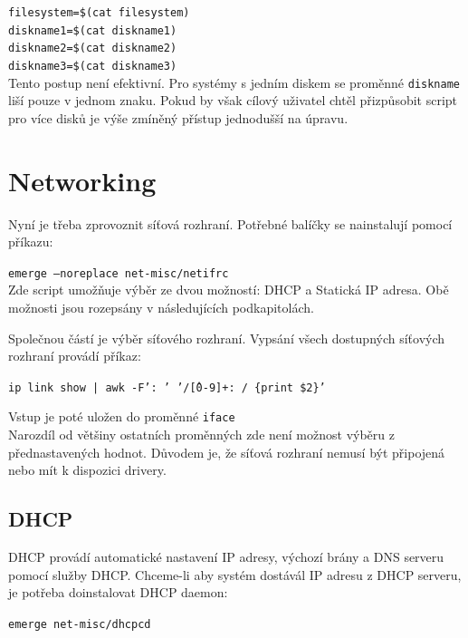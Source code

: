 \documentclass[12pt,a4paper,twoside,]{article}
\begin{document}
{{{{{{\texttt{filesystem=\$(cat filesystem)}\\
\hspace*{1.5em}\texttt{diskname1=\$(cat diskname1)}\\
\hspace*{1.5em}\texttt{diskname2=\$(cat diskname2)}\\
\hspace*{1.5em}\texttt{diskname3=\$(cat diskname3)}\\

\hspace*{-1.5em}Tento postup není efektivní. Pro systémy s jedním diskem se proměnné \texttt{diskname} liší pouze v jednom znaku. Pokud by však cílový uživatel chtěl přizpůsobit script pro více disků je výše zmíněný přístup jednodušší na úpravu.
\newpage

\section{\textsf{Networking}}
Nyní je třeba zprovoznit síťová rozhraní. Potřebné balíčky se nainstalují pomocí příkazu:

\texttt{emerge --noreplace net-misc/netifrc}\\


\hspace{-1.5em}Zde script umožňuje výběr ze dvou možností: DHCP a Statická IP adresa. Obě možnosti jsou rozepsány v následujících podkapitolách.

\hspace{-1.5em}Společnou částí je výběr síťového rozhraní. Vypsání všech dostupných síťových rozhraní provádí příkaz:

\texttt{ip link show | awk -F': ' '/\^[0-9]+: / \{print \$2\}'}

\hspace{-1.5em}Vstup je poté uložen do proměnné \texttt{iface}\\
Narozdíl od většiny ostatních proměnných zde není možnost výběru z přednastavených hodnot. Důvodem je, že síťová rozhraní nemusí být připojená nebo mít k dispozici drivery.
\subsection{\textsf{DHCP}}
DHCP provádí automatické nastavení IP adresy, výchozí brány a DNS serveru pomocí služby DHCP.
Chceme-li aby systém dostávál IP adresu z DHCP serveru, je potřeba doinstalovat DHCP daemon:

\texttt{emerge net-misc/dhcpcd}

}}}}}}
\end{document}
